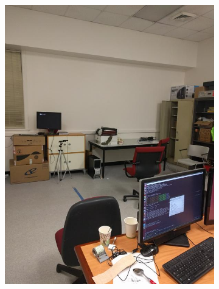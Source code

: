 \documentclass[12pt]{article}
\begin{document}
\begin{figure}[t!]
    \begin{subfigure}[t]{0.1\textwidth}
        \centering
        \includegraphics[width=\linewidth]{../Images/Set3/1}
    \end{subfigure}
    \begin{subfigure}[t]{0.1\textwidth}
        \centering

\end{subfigure}
\end{figure}
\end{document}
